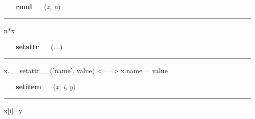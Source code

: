     \vspace{0.5ex}

    \begin{boxedminipage}{\textwidth}

    \raggedright \textbf{\_\_rmul\_\_}(\textit{x}, \textit{n})

    \vspace{-1.5ex}

    \rule{\textwidth}{0.5\fboxrule}

n*x
    \vspace{1ex}

    \end{boxedminipage}

    \label{object:__setattr__}

    \vspace{0.5ex}

    \begin{boxedminipage}{\textwidth}

    \raggedright \textbf{\_\_setattr\_\_}(\textit{...})

    \vspace{-1.5ex}

    \rule{\textwidth}{0.5\fboxrule}

x.{\_}{\_}setattr{\_}{\_}('name', value) {\textless}=={\textgreater} x.name = value
    \vspace{1ex}

    \end{boxedminipage}

    \label{list:__setitem__}

    \vspace{0.5ex}

    \begin{boxedminipage}{\textwidth}

    \raggedright \textbf{\_\_setitem\_\_}(\textit{x}, \textit{i}, \textit{y})

    \vspace{-1.5ex}

    \rule{\textwidth}{0.5\fboxrule}

x{[}i{]}=y
    \vspace{1ex}

    \end{boxedminipage}

    \label{list:__setslice__}

    \vspace{0.5ex}

